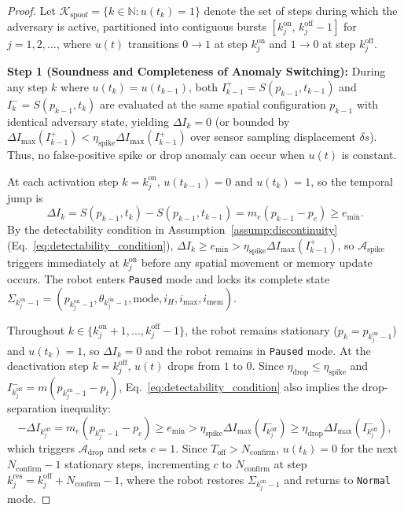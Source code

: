 \documentclass[12pt, a4paper]{article}
\begin{document}
\begin{proof}
Let $\mathcal{K}_{\text{spoof}} = \{k \in \mathbb{N} : u(t_k) = 1\}$ denote the set of steps during which the adversary is active, partitioned into contiguous bursts $[k_j^{\text{on}},\, k_j^{\text{off}} - 1]$ for $j = 1, 2, \dots$, where $u(t)$ transitions $0 \to 1$ at step $k_j^{\text{on}}$ and $1 \to 0$ at step $k_j^{\text{off}}$.

\textbf{Step 1 (Soundness and Completeness of Anomaly Switching):}
During any step $k$ where $u(t_k) = u(t_{k-1})$, both $I_{k-1}^+ = S(p_{k-1}, t_{k-1})$ and $I_k^- = S(p_{k-1}, t_k)$ are evaluated at the same spatial configuration $p_{k-1}$ with identical adversary state, yielding $\Delta I_k = 0$ (or bounded by $\Delta I_{\max}(I_{k-1}^+) < \eta_{\text{spike}}\Delta I_{\max}(I_{k-1}^+)$ over sensor sampling displacement $\delta s$). Thus, no false-positive spike or drop anomaly can occur when $u(t)$ is constant.

At each activation step $k = k_j^{\text{on}}$, $u(t_{k-1}) = 0$ and $u(t_k) = 1$, so the temporal jump is
\begin{equation*}
    \Delta I_k = S(p_{k-1}, t_k) - S(p_{k-1}, t_{k-1}) = m_e(p_{k-1} - p_e) \ge e_{\min}.
\end{equation*}
By the detectability condition in Assumption~\ref{assump:discontinuity} (Eq.~\eqref{eq:detectability_condition}), $\Delta I_k \ge e_{\min} > \eta_{\text{spike}}\Delta I_{\max}(I_{k-1}^+)$, so $\mathcal{A}_{\text{spike}}$ triggers immediately at $k_j^{\text{on}}$ before any spatial movement or memory update occurs. The robot enters \texttt{Paused} mode and locks its complete state $\Sigma_{k_j^{\text{on}}-1} = (p_{k_j^{\text{on}}-1}, \theta_{k_j^{\text{on}}-1}, \text{mode}, i_H, i_{\text{max}}, i_{\text{mem}})$.

Throughout $k \in \{k_j^{\text{on}} + 1, \dots, k_j^{\text{off}} - 1\}$, the robot remains stationary ($p_k = p_{k_j^{\text{on}}-1}$) and $u(t_k) = 1$, so $\Delta I_k = 0$ and the robot remains in \texttt{Paused} mode. At the deactivation step $k = k_j^{\text{off}}$, $u(t)$ drops from $1$ to $0$. Since $\eta_{\text{drop}} \le \eta_{\text{spike}}$ and $I_{k_j^{\text{off}}}^- = m(p_{k_j^{\text{on}}-1} - p_t)$, Eq.~\eqref{eq:detectability_condition} also implies the drop-separation inequality:
\begin{equation*}
    -\Delta I_{k_j^{\text{off}}} = m_e(p_{k_j^{\text{on}}-1} - p_e) \ge e_{\min} > \eta_{\text{spike}}\Delta I_{\max}(I_{k_j^{\text{off}}}^-) \ge \eta_{\text{drop}}\Delta I_{\max}(I_{k_j^{\text{off}}}^-),
\end{equation*}
which triggers $\mathcal{A}_{\text{drop}}$ and sets $c = 1$. Since $T_{\text{off}} > N_{\text{confirm}}$, $u(t_k) = 0$ for the next $N_{\text{confirm}} - 1$ stationary steps, incrementing $c$ to $N_{\text{confirm}}$ at step $k_j^{\text{res}} = k_j^{\text{off}} + N_{\text{confirm}} - 1$, where the robot restores $\Sigma_{k_j^{\text{on}}-1}$ and returns to \texttt{Normal} mode.


\end{proof}
\end{document}
